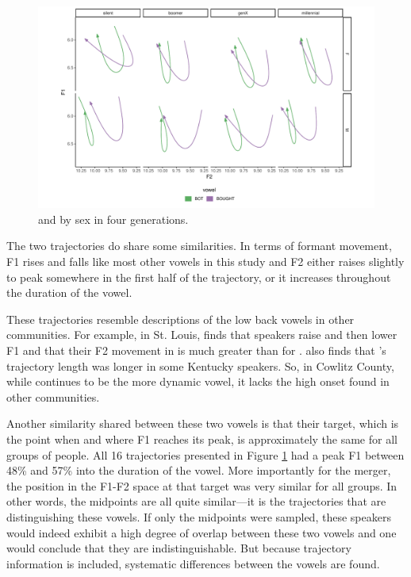 \begin{figure}[tb!]
    \centering
    \includegraphics[width = 6.5in]{Figures/other_figures/low_back_trajs.pdf}
    \caption{\lot and \thought by sex in four generations.}
    \label{fig:bot_and_bought}
\end{figure}

The two trajectories do share some similarities. In terms of formant movement, F1 rises and falls like most other vowels in this study and F2 either raises slightly to peak somewhere in the first half of the trajectory, or it increases throughout the duration of the vowel.

These trajectories resemble descriptions of the low back vowels in other communities. For example, in St. Louis, \citet[176]{majors_2005} finds that speakers raise and then lower F1 and that their F2 movement in \thought is much greater than for \lot. \citet[159--161]{irons_2007} also finds that \thought's trajectory length was longer in some Kentucky speakers. So, in Cowlitz County, while \thought continues to be the more dynamic vowel, it lacks the high onset found in other communities.

Another similarity shared between these two vowels is that their target, which is the point when and where F1 reaches its peak, is approximately the same for all groups of people. All 16 trajectories presented in Figure \ref{fig:bot_and_bought} had a peak F1 between 48\% and 57\% into the duration of the vowel. More importantly for the merger, the position in the F1-F2 space at that target was very similar for all groups. In other words, the midpoints are all quite similar---it is the trajectories that are distinguishing these vowels. If only the midpoints were sampled, these speakers would indeed exhibit a high degree of overlap between these two vowels and one would conclude that they are indistinguishable. But because trajectory information is included, systematic differences between the vowels are found.


